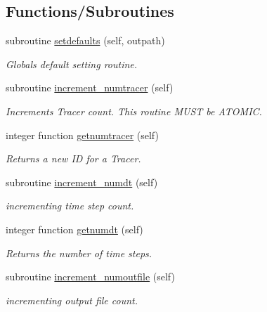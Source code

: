\subsection*{Functions/\+Subroutines}
\begin{DoxyCompactItemize}
\item 
subroutine \mbox{\hyperlink{namespacesimulation__globals__mod_a11bedd9242e49b12d9e305d45ef9ea00}{setdefaults}} (self, outpath)
\begin{DoxyCompactList}\small\item\em Globals default setting routine. \end{DoxyCompactList}\item 
subroutine \mbox{\hyperlink{namespacesimulation__globals__mod_ae9910caa377f4d2875e59c749ee0488c}{increment\+\_\+numtracer}} (self)
\begin{DoxyCompactList}\small\item\em Increments Tracer count. This routine M\+U\+ST be A\+T\+O\+M\+IC. \end{DoxyCompactList}\item 
integer function \mbox{\hyperlink{namespacesimulation__globals__mod_a8314536e15b0e28f0072da22d2a2ecbf}{getnumtracer}} (self)
\begin{DoxyCompactList}\small\item\em Returns a new ID for a Tracer. \end{DoxyCompactList}\item 
subroutine \mbox{\hyperlink{namespacesimulation__globals__mod_a4e649e57b574f384eeca405a4c3c10b0}{increment\+\_\+numdt}} (self)
\begin{DoxyCompactList}\small\item\em incrementing time step count. \end{DoxyCompactList}\item 
integer function \mbox{\hyperlink{namespacesimulation__globals__mod_a7caca00d4eeb93c4120f0a8b27dda478}{getnumdt}} (self)
\begin{DoxyCompactList}\small\item\em Returns the number of time steps. \end{DoxyCompactList}\item 
subroutine \mbox{\hyperlink{namespacesimulation__globals__mod_a3f685028fd342cb9525599e00f04c7a6}{increment\+\_\+numoutfile}} (self)
\begin{DoxyCompactList}\small\item\em incrementing output file count. \end{DoxyCompactList}\item 

\end{DoxyCompactItemize}
